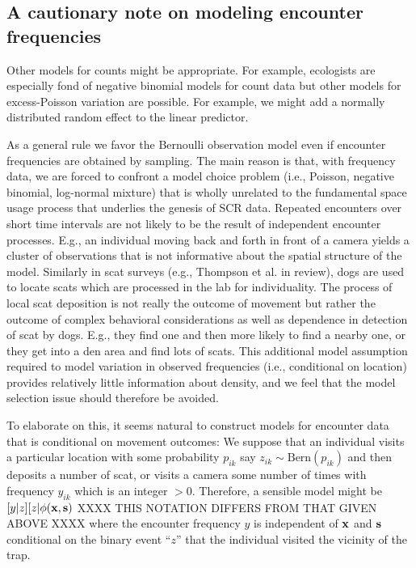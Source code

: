 \subsection{A cautionary note on modeling encounter frequencies}

Other models for counts might be appropriate. For example, ecologists
are especially fond of negative binomial models for count data
\citep{verhoef_boveng:2007,
white_bennetts:1996,kery_etal:2005}
but other models for excess-Poisson variation are possible. For
example, we might add a normally distributed random effect to
the linear predictor.

As a general rule we favor the Bernoulli observation model even if
encounter frequencies are obtained by sampling.  The main reason is
that, with frequency data, we are forced to confront a model choice
problem (i.e., Poisson, negative binomial, log-normal mixture) that is
wholly unrelated to the fundamental space usage process that underlies
the genesis of SCR data. Repeated encounters over short time intervals
are not likely to be the result of independent encounter
processes. E.g., an individual moving back and forth in front of a
camera yields a cluster of observations that is not informative about
the spatial structure of the model. Similarly in scat surveys (e.g.,
Thompson et al. in review), dogs are used to locate scats which are
processed in the lab for individuality.  The process of local scat
deposition is not really the outcome of movement but rather the
outcome of complex behavioral considerations as well as dependence in
detection of scat by dogs. E.g., they find one and then more likely to
find a nearby one, or they get into a den area and find lots of scats.
This additional model assumption required to model variation in
observed frequencies (i.e., conditional on location) provides
relatively little information about density, and we feel that the
model selection issue should therefore be avoided.

To elaborate on this, it seems natural to construct models for
encounter data that is conditional on movement outcomes: We suppose
that an individual visits a particular location with some probability
$p_{ik}$ say $z_{ik}\sim  \mbox{Bern}(p_{ik})$ and then deposits a number of scat,
or visits a camera some number of times with frequency $y_{ik}$ which
is 
an integer $> 0$. Therefore, a sensible model might be
$[y|z][z|\phi({\bf x},{\bf s})$
XXXX THIS NOTATION DIFFERS FROM THAT GIVEN ABOVE XXXX
where the encounter frequency $y$ is independent of ${\bf x}$ and
${\bf s}$ conditional
on the binary event ``$z$'' that the individual visited the vicinity of
the trap.

